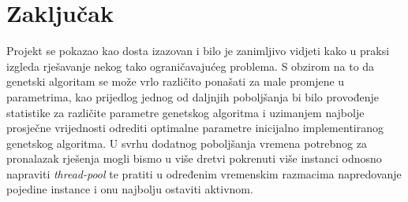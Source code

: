 \documentclass[11pt]{article}
\begin{document}
\section{Zaključak}
Projekt se pokazao kao dosta izazovan i bilo je zanimljivo vidjeti kako u praksi izgleda rješavanje nekog tako ograničavajućeg problema. S obzirom na to da genetski algoritam se može vrlo različito ponašati za male promjene u parametrima, kao prijedlog jednog od daljnjih poboljšanja bi bilo provođenje statistike za različite parametre genetskog algoritma i uzimanjem najbolje prosječne vrijednosti odrediti optimalne parametre inicijalno implementiranog genetskog algoritma. U svrhu dodatnog poboljšanja vremena potrebnog za pronalazak rješenja mogli bismo u više dretvi pokrenuti više instanci odnosno napraviti \textit{thread-pool} te pratiti u određenim vremenskim razmacima napredovanje pojedine instance i onu najbolju ostaviti aktivnom.

\end{document}
